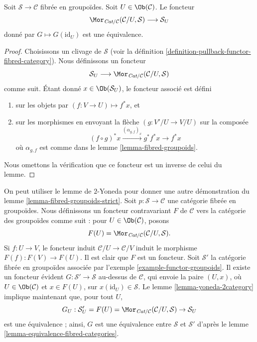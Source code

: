 \begin{lemma}
\label{lemma-yoneda-2category}
Soit $\mathcal{S}\to \mathcal{C}$ fibrée en groupoïdes.
Soit $U \in \Ob(\mathcal{C})$.
Le foncteur
$$
\Mor_{\textit{Cat}/\mathcal{C}}(\mathcal{C}/U, \mathcal{S})
\longrightarrow
\mathcal{S}_U
$$
donné par $G \mapsto G(\text{id}_U)$ est une équivalence.
\end{lemma}

\begin{proof}
Choisissons un clivage de $\mathcal{S}$
(voir la définition \ref{definition-pullback-functor-fibred-category}).
Nous définissons un foncteur
$$
\mathcal{S}_U
\longrightarrow
\Mor_{\textit{Cat}/\mathcal{C}}(\mathcal{C}/U, \mathcal{S})
$$
comme suit. Étant donné
$x \in \Ob(\mathcal{S}_U)$,
le foncteur associé est défini
\begin{enumerate}
\item sur les objets par $(f : V \to U) \mapsto f^*x$, et
\item sur les morphismes en envoyant la flèche
$(g : V'/U \to V/U)$ sur la composée
$$
(f \circ g)^*x \xrightarrow{(\alpha_{g, f})_x} g^*f^*x \rightarrow f^*x
$$
où $\alpha_{g, f}$ est comme dans le lemme \ref{lemma-fibred-groupoids}.
\end{enumerate}
Nous omettons la vérification que ce foncteur est un inverse de celui du lemme.
\end{proof}

\begin{remark}
\label{remark-alternative-fibred-groupoids-strict}
On peut utiliser le lemme de $2$-Yoneda pour donner une autre démonstration du
lemme \ref{lemma-fibred-groupoids-strict}.
Soit $p : \mathcal{S} \to \mathcal{C}$ une catégorie fibrée en groupoïdes.
Nous définissons un foncteur contravariant $F$ de $\mathcal{C}$ vers la
catégorie des groupoïdes comme suit : pour $U\in \Ob(\mathcal{C})$,
posons
$$
F(U) = \Mor_{\textit{Cat}/\mathcal{C}}(\mathcal{C}/U, \mathcal{S}).
$$
Si $f : U \to V$, le foncteur induit $\mathcal{C}/U \to \mathcal{C}/V$
induit le morphisme $F(f) : F(V) \to F(U)$. Il est clair que $F$ est un foncteur.
Soit $\mathcal{S}'$ la catégorie fibrée en groupoïdes associée par
l'exemple \ref{example-functor-groupoids}.
Il existe un foncteur évident $G : \mathcal{S}' \to \mathcal{S}$
au-dessus de $\mathcal{C}$, qui envoie la paire $(U, x)$, où
$U \in \Ob(\mathcal{C})$ et $x \in F(U)$, sur
$x(\text{id}_U) \in \mathcal{S}$. Le
lemme \ref{lemma-yoneda-2category}
implique maintenant que, pour tout $U$,
$$
G_U : \mathcal{S}'_U = F(U)=
\Mor_{\textit{Cat}/\mathcal{C}}(\mathcal{C}/U, \mathcal{S})
\to
\mathcal{S}_U
$$
est une équivalence ; ainsi, $G$ est une équivalence entre $\mathcal{S}$ et
$\mathcal{S}'$ d'après le lemme \ref{lemma-equivalence-fibred-categories}.
\end{remark}






